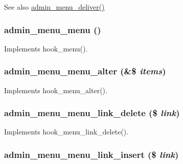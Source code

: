 \begin{DoxySeeAlso}{See also}
\hyperlink{admin__menu_8module_ab013e2c0ba08ba3bd0ea79bb9aa6518b}{admin\_\-menu\_\-deliver()} 
\end{DoxySeeAlso}
\hypertarget{admin__menu_8module_a890b6285791642bfa4420583457fb473}{
\subsubsection[{admin\_\-menu\_\-menu}]{\setlength{\rightskip}{0pt plus 5cm}admin\_\-menu\_\-menu ()}}
\label{admin__menu_8module_a890b6285791642bfa4420583457fb473}
Implements hook\_\-menu(). \hypertarget{admin__menu_8module_a5215739b9f88a38d14ba99f5413b904e}{
\subsubsection[{admin\_\-menu\_\-menu\_\-alter}]{\setlength{\rightskip}{0pt plus 5cm}admin\_\-menu\_\-menu\_\-alter (\&\$ {\em items})}}
\label{admin__menu_8module_a5215739b9f88a38d14ba99f5413b904e}
Implements hook\_\-menu\_\-alter(). \hypertarget{admin__menu_8module_a0fb7c76d79321ad3bc3cbb6566c455a2}{
\subsubsection[{admin\_\-menu\_\-menu\_\-link\_\-delete}]{\setlength{\rightskip}{0pt plus 5cm}admin\_\-menu\_\-menu\_\-link\_\-delete (\$ {\em link})}}
\label{admin__menu_8module_a0fb7c76d79321ad3bc3cbb6566c455a2}
Implements hook\_\-menu\_\-link\_\-delete(). \hypertarget{admin__menu_8module_aa2fdb44794becd942d82791196fb3175}{
\subsubsection[{admin\_\-menu\_\-menu\_\-link\_\-insert}]{\setlength{\rightskip}{0pt plus 5cm}admin\_\-menu\_\-menu\_\-link\_\-insert (\$ {\em link})}}
